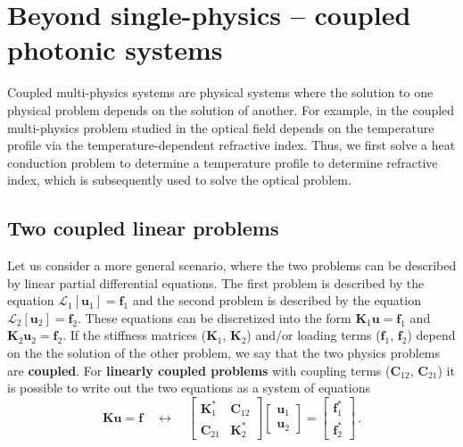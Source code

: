     \section{Beyond single-physics -- coupled photonic systems}\label{sec:coupled}

    Coupled multi-physics systems are physical systems where the solution to one physical 
    problem depends on the solution of another. For example, in the coupled multi-physics 
    problem studied in \cite{ownpub0} the optical field depends on the temperature profile via
    the temperature-dependent refractive index. Thus, we first solve a heat conduction problem to determine
    a temperature profile to determine refractive index, which is subsequently used to solve the optical problem.
    \subsection*{Two coupled linear problems}
     Let us consider a more general scenario, where the two
    problems can be described by linear partial differential equations. The
    first problem
    is described by the equation $\mathcal{L}_1 [\mathbf{u}_1]= \mathbf{f}_1$ and
    the second problem is described by the
    equation $\mathcal{L}_2 [\mathbf{u}_2]= \mathbf{f}_2$. These equations can be
    discretized into the form $\mathbf{K}_1 \mathbf{u} = \mathbf{f}_1$ and $\mathbf{K}_2 \mathbf{u}_2 =
\mathbf{f}_2$.
    If the stiffness matrices ($\mathbf{K}_1$, $\mathbf{K}_2$) and/or loading terms ($\mathbf{f}_1$, $\mathbf{f}_2$) depend on the the solution of the
    other problem, we say that the two physics problems are
    \textbf{coupled}. For \textbf{linearly coupled problems} with coupling terms ($\mathbf{C}_{12}$, $\mathbf{C}_{21}$) it is possible to write out the two equations as a system of equations
    \begin{equation}\label{eq:c_N_2}
        \mathbf{K} \mathbf{u} = \mathbf{f} \quad \longleftrightarrow \quad 
        \begin{bmatrix}
            \mathbf{K}^*_1  & \mathbf{C}_{12} \\
            \mathbf{C}_{21} & \mathbf{K}^*_2
        \end{bmatrix}
        \begin{bmatrix}
            \mathbf{u}_1 \\
            \mathbf{u}_2
        \end{bmatrix}
        =
        \begin{bmatrix}
            \mathbf{f}_1^* \\
            \mathbf{f}_2^*
        \end{bmatrix}\,.
    \end{equation}
